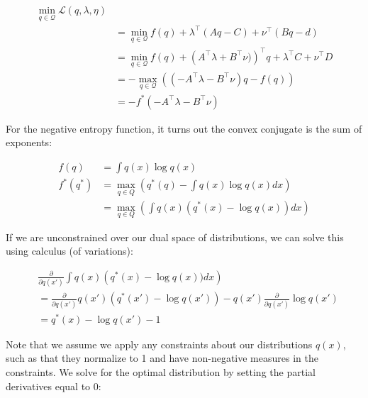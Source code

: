 \documentclass[a4paper]{article}
\begin{document}
\begin{equation}
  \begin{split}
    \min_{q \in \mathcal{Q} } \mathcal{L}( q, \lambda, \eta) \\
    &= \min_{q \in \mathcal{Q} } f(q) + \lambda^\intercal \left( A q - C \right) + \nu^\intercal \left( B q - d \right) \\
    &= \min_{q \in \mathcal{Q} } f(q) + \left( A^\intercal \lambda +  B^\intercal \nu )\right)^\intercal q + \lambda^\intercal C + \nu^\intercal D \\
    &= - \max_{q \in \mathcal{Q} } \left( \left( - A^\intercal \lambda - B^\intercal \nu \right) q - f(q) \right) \\
    &= - f^* \left( - A^\intercal \lambda - B^\intercal \nu \right)
  \end{split}
  \label{}
\end{equation}

For the negative entropy function, it turns out the convex conjugate is the sum of exponents:

\begin{equation}
  \begin{split}
    f(q) &= \int q(x) \log q(x) \\
    f^*(q^*) &= \max_{q \in Q} \left( q^*(q) - \int q(x) \log q(x) dx \right) \\
    &= \max_{q \in Q} \left( \int q(x) ( q^*(x) - \log q(x) ) dx \right)
  \end{split}
  \label{}
\end{equation}

If we are unconstrained over our dual space of distributions, we can solve this using calculus (of variations):

\begin{equation}
  \begin{split}
    & \frac{\partial}{\partial q(x') } \int q(x) \left( q^*(x) - \log q(x) ) dx \right) \\
    &= \frac{\partial}{\partial q(x')} q(x') \left( q^*(x') - \log q(x') \right) - q(x') \frac{\partial}{\partial q(x')} \log q(x') \\
    &= q^*(x) - \log q(x') - 1
  \end{split}
  \label{}
\end{equation}

Note that we assume we apply any constraints about our distributions $q(x)$, such as that they normalize to 1 and have non-negative measures in the constraints.  We solve for the optimal distribution by setting the partial derivatives equal to 0:
\end{document}
